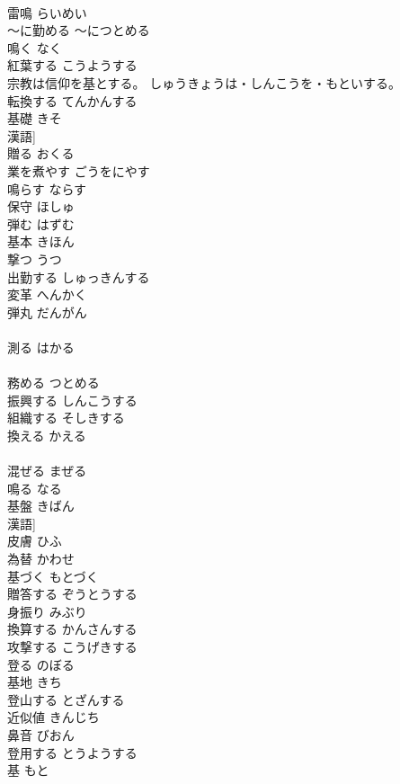 \documentclass[8pt]{extreport}
\begin{document}
\begin{CJK}{UTF8}{min}
\\	雷鳴	らいめい	
\\	～に勤める	～につとめる	
\\	鳴く	なく	
\\	紅葉する	こうようする	
\\	宗教は信仰を基とする。	しゅうきょうは・しんこうを・もといする。	
\\	転換する	てんかんする	
\\	基礎	きそ	
\\	漢語]
\\	贈る	おくる	
\\	業を煮やす	ごうをにやす	
\\	鳴らす	ならす	
\\	保守	ほしゅ	
\\	弾む	はずむ	
\\	基本	きほん	
\\	撃つ	うつ	
\\	出勤する	しゅっきんする	
\\	変革	へんかく	
\\	弾丸	だんがん	
\\	[漢語]
\\	測る	はかる	
\\	[和語]
\\	務める	つとめる	
\\	振興する	しんこうする	
\\	組織する	そしきする	
\\	換える	かえる	
\\	[和語]
\\	混ぜる	まぜる	
\\	鳴る	なる	
\\	基盤	きばん	
\\	漢語]
\\	皮膚	ひふ	
\\	為替	かわせ	
\\	基づく	もとづく	
\\	贈答する	ぞうとうする	
\\	身振り	みぶり	
\\	換算する	かんさんする	
\\	攻撃する	こうげきする	
\\	登る	のぼる	
\\	基地	きち	
\\	登山する	とざんする	
\\	近似値	きんじち	
\\	鼻音	びおん	
\\	登用する	とうようする	
\\	基	もと	

\end{CJK}
\end{document}
